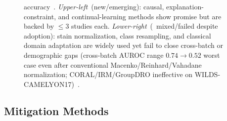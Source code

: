 \begin{figure}[!ht]
{           accuracy~\citep{howard2021site, murchan2024combat,
           lin2025contrastive, xu2026spare, hosseini2023proportionally,
           zhang2025dynamicfl, huang2025knowledge}.
           \emph{Upper-left}~(new/emerging):
           causal, explanation-constraint, and continual-learning
           methods show promise but are backed by ${\leq}3$ studies
           each.
          \emph{Lower-right}~(\textdownarrow~mixed/failed despite adoption):
          stain normalization, class resampling, and classical domain
          adaptation are widely used yet fail to close cross-batch
          or demographic gaps (cross-batch AUROC range $0.74\!\to\!0.52$
          worst case even after conventional Macenko/Reinhard/Vahadane normalization;
           CORAL/IRM/GroupDRO ineffective on WILDS-CAMELYON17)~\citep{
           komen2024batch, lin2025stain, voon2023evaluating,
           koh2021wilds}.}
  \label{fig:mitigation_grid}
\end{figure}

\subsection{Mitigation Methods}
\label{sec:results:mitigation}

